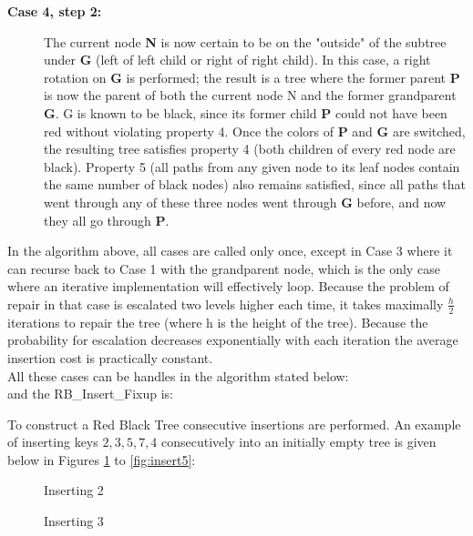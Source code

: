 \documentclass{article}[10pt]
\begin{document}
\begin{description}
    \item[\textbf{Case 4, step 2:}]    
                The current node \textbf{N} is now certain to be on the "outside" of the subtree under \textbf{G} (left of left child or right of right child). In this case, a right rotation on \textbf{G} is performed; the result is a tree where the former parent \textbf{P} is now the parent of both the current node N and the former grandparent \textbf{G}. G is known to be black, since its former child \textbf{P} could not have been red without violating property 4. Once the colors of \textbf{P} and \textbf{G} are switched, the resulting tree satisfies property 4 (both children of every red node are black). Property 5 (all paths from any given node to its leaf nodes contain the same number of black nodes) also remains satisfied, since all paths that went through any of these three nodes went through \textbf{G} before, and now they all go through \textbf{P}.
\end{description}
In the algorithm above, all cases are called only once, except in Case 3 where it can recurse back to Case 1 with the grandparent node, which is the only case where an iterative implementation will effectively loop. Because the problem of repair in that case is escalated two levels higher each time, it takes maximally $\frac{h}{2}$ iterations to repair the tree (where h is the height of the tree). Because the probability for escalation decreases exponentially with each iteration the average insertion cost is practically constant.\\
All these cases can be handles in the algorithm stated below:
\\

\vspace{0.5cm}
and the RB\_Insert\_Fixup is: \\

\vspace{0.5cm}

To construct a Red Black Tree consecutive insertions are performed. An example of inserting keys ${2,3,5,7,4}$ consecutively into an initially empty tree is given below in Figures \ref{fig:insert1} to \ref{fig:insert5}:

\begin{figure}[htbp]
	\centering
	
	\caption{Inserting 2} 
	\label{fig:insert1}
\end{figure}

\begin{figure}
	\centering
	
	\caption{Inserting 3}
	\label{fig:insert2}
\end{figure}
\end{document}
